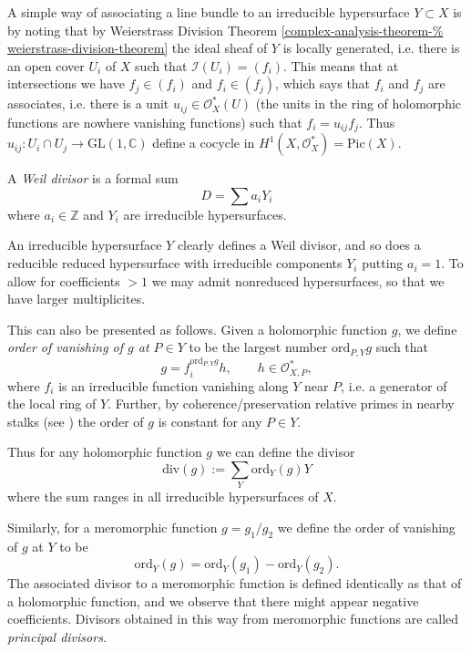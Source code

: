 \noindent
A simple way of associating a line bundle to
an irreducible
hypersurface $Y\subset X$ is by noting that
by Weierstrass Division Theorem
\ref{complex-analysis-theorem-%
weierstrass-division-theorem}
the ideal sheaf of $Y$ is locally generated,
i.e. there is an open cover $U_i$ of $X$
such that $\mathcal{I}(U_i)=(f_i)$.
This means that at intersections we have
$f_j \in (f_i)$ and $f_i\in (f_j)$,
which says that $f_i$ and $f_j$ are
associates,
i.e. there is a unit $u_{ij} \in
\mathcal{O}^*_X(U)$
(the units in the ring of holomorphic
functions
are nowhere vanishing functions)
such that $f_i=u_{ij}f_j$.
Thus $u_{ij}:U_i\cap U_j \to
\text{GL}(1,\mathbb{C})$
define a cocycle in $H^1(X,\mathcal{O}^*_X) =
\text{Pic}(X)$.

\begin{definition}
\label{definition-divisor}
A {\it Weil divisor} is a formal sum
$$
D=\sum a_i Y_i
$$
where $a_i\in \mathbb{Z}$ and $Y_i$ are
irreducible hypersurfaces.
\end{definition}

\noindent
An irreducible hypersurface $Y$ clearly
defines a Weil divisor,
and so does a reducible reduced hypersurface
with irreducible
components $Y_i$ putting $a_i=1$.
To allow for coefficients $>1$ we may admit
nonreduced hypersurfaces,
so that we have larger multiplicites.

This can also be presented as follows.
Given a holomorphic function $g$, we define
{\it order of vanishing of $g$ at $P \in Y$}
to be the largest number $\text{ord}_{P,Y}g$
such that
$$
g=f_i^{\text{ord}_{P,Y}g}h,\qquad h \in
\mathcal{O}^*_{X,P},
$$
where $f_i$ is an irreducible function
vanishing along $Y$ near $P$,
i.e. a generator of the local ring of $Y$.
Further, by coherence/preservation relative
primes in nearby stalks
(see \cite[p. 696]{gri})
the order of $g$ is constant for any $P \in
Y$.

Thus for any holomorphic function $g$
we can define the divisor
$$
\text{div}(g):=\sum_{Y}\text{ord}_Y(g)Y
$$
where the sum ranges in all irreducible
hypersurfaces of $X$.

Similarly, for a meromorphic function
$g=g_1/g_2$
we define the order of vanishing of $g$ at
$Y$ to be
$$
\text{ord}_Y(g)=\text{ord}_Y(g_1)-\text{ord}
_Y(g_2).
$$
The associated divisor to a meromorphic
function
is defined identically as that of a
holomorphic function,
and we observe that there might appear
negative coefficients.
Divisors obtained in this way from
meromorphic functions
are called {\it principal divisors}.


